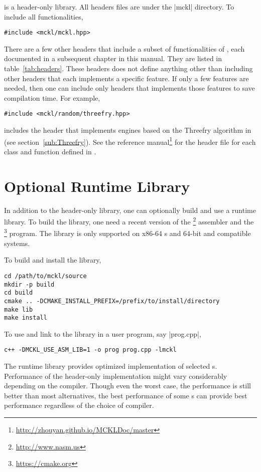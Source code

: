 \mckl is a header-only library. All headers files are under the |mckl|
directory. To include all functionalities,
\begin{verbatim}
#include <mckl/mckl.hpp>
\end{verbatim}
There are a few other headers that include a subset of functionalities of
\mckl, each documented in a subsequent chapter in this manual. They are listed
in table~\ref{tab:headers}. These headers does not define anything other than
including other headers that each implements a specific feature. If only a few
features are needed, then one can include only headers that implements those
features to save compilation time. For example,
\begin{verbatim}
#include <mckl/random/threefry.hpp>
\end{verbatim}
includes the header that implements \rng engines based on the Threefry
algorithm in~\cite{Salmon:2011um} (see section~\ref{sub:Threefry}). See the
reference manual\footnote{\url{http://zhouyan.github.io/MCKLDoc/master}} for
the header file for each class and function defined in \mckl.

\section{Optional Runtime Library}
\label{sec:Optional Runtime Library}

In addition to the header-only library, one can optionally build and use a
runtime library. To build the library, one need a recent version of the
\nasm\footnote{\url{http://www.nasm.us}} assembler and the
\cmake\footnote{\url{https://cmake.org}} program. The library is only supported
on x86-64 \cpu{}s and 64-bit \unix and compatible systems.

To build and install the library,
\begin{verbatim}
cd /path/to/mckl/source
mkdir -p build
cd build
cmake .. -DCMAKE_INSTALL_PREFIX=/prefix/to/install/directory
make lib
make install
\end{verbatim}
To use and link to the library in a user program, say |prog.cpp|,
\begin{verbatim}
c++ -DMCKL_USE_ASM_LIB=1 -o prog prog.cpp -lmckl
\end{verbatim}

The runtime library provides optimized implementation of selected \rng{}s.
Performance of the header-only implementation might vary considerably depending
on the compiler. Though even the worst case, the performance is still better
than most alternatives, the best performance of some \rng{}s can provide best
performance regardless of the choice of compiler.

